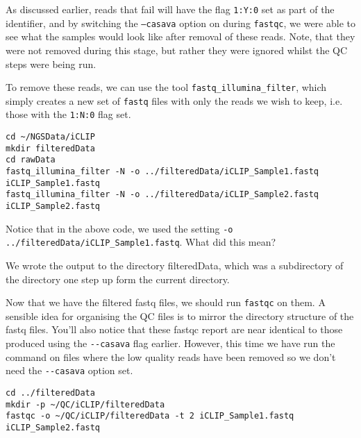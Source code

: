 As discussed earlier, reads that fail will have the flag \texttt{1:Y:0} set as part of the identifier, and by switching the \texttt{--casava} option on during \texttt{fastqc}, we were able to see what the samples would look like after removal of these reads.
Note, that they were not removed during this stage, but rather they were ignored whilst the QC steps were being run. \\

\begin{steps}
To remove these reads, we can use the tool \texttt{fastq_illumina_filter}, which simply creates a new set of \texttt{fastq} files with only the reads we wish to keep, i.e. those with the \texttt{1:N:0} flag set.
\begin{lstlisting}
cd ~/NGSData/iCLIP
mkdir filteredData
cd rawData
fastq_illumina_filter -N -o ../filteredData/iCLIP_Sample1.fastq iCLIP_Sample1.fastq
fastq_illumina_filter -N -o ../filteredData/iCLIP_Sample2.fastq iCLIP_Sample2.fastq
\end{lstlisting}
\end{steps}

\begin{questions}
Notice that in the above code, we used the setting \texttt{-o ../filteredData/iCLIP_Sample1.fastq}.
What did this mean?\\
\begin{answer}
We wrote the output to the directory filteredData, which was a subdirectory of the directory one step up form the current directory.
\end{answer}
\end{questions}

\begin{information}
Now that we have the filtered fastq files, we should run \texttt{fastqc} on them.
A sensible idea for organising the QC files is to mirror the directory structure of the fastq files.
You'll also notice that these fastqc report are near identical to those produced using the \texttt{-{}-casava} flag earlier.
However, this time we have run the command on files where the low quality reads have been removed so we don't need the \texttt{-{}-casava} option set. \\
\end{information}

\begin{steps}
\begin{lstlisting}
cd ../filteredData
mkdir -p ~/QC/iCLIP/filteredData
fastqc -o ~/QC/iCLIP/filteredData -t 2 iCLIP_Sample1.fastq iCLIP_Sample2.fastq
\end{lstlisting}
\end{steps}

